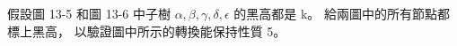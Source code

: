 \startEXERCISE
假設圖 13-5 和圖 13-6 中子樹
 $\alpha,\beta,\gamma,\delta,\epsilon$ 的黑高都是 k。
給兩圖中的所有節點都標上黑高，
以驗證圖中所示的轉換能保持性質 5。
\stopEXERCISE

\startANSWER
\externalfigure[e13_3_3-1]

\externalfigure[e13_3_3-2]

\externalfigure[e13_3_3-3]
\stopANSWER
